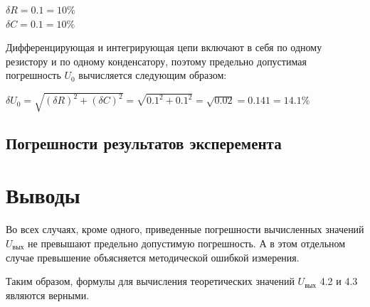 \begin{center}
$\delta R = 0.1 = 10\%$\\
$\delta C = 0.1 = 10\%$\\
\end{center}

Дифференцирующая и интегрирующая цепи включают в себя по одному резистору и по одному конденсатору, поэтому предельно допустимая погрешность $U_0$ вычисляется следующим образом:


$\delta U_0 = \sqrt{(\delta R)^2 + (\delta C)^2} = \sqrt{0.1^2 + 0.1^2} = \sqrt{0.02} = 0.141 = 14.1 \%$

\subsection{Погрешности результатов эксперемента} %

  
\section{Выводы}

Во всех случаях, кроме одного, приведенные погрешности вычисленных значений $U_\text{вых}$ не превышают предельно допустимую погрешность. А в этом отдельном случае превышение объясняется методической ошибкой измерения.

Таким образом, формулы для вычисления теоретических значений $U_\text{вых}$ 4.2 и 4.3 являются верными.



